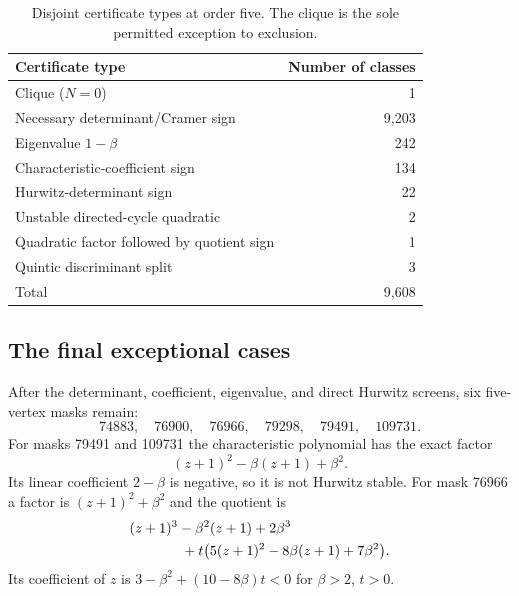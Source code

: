 \documentclass[11pt,a4paper]{article}
\theoremstyle{definition}\newtheorem{definition}[theorem]{Definition}
\theoremstyle{remark}\newtheorem{remark}[theorem]{Remark}
\begin{document}
\begin{table}[ht]
\centering
\caption{Disjoint certificate types at order five. The clique is the sole permitted exception to exclusion.}
\begin{tabular}{lr}\toprule
Certificate type & Number of classes\\\midrule
Clique ($N=0$)&1\\
Necessary determinant/Cramer sign&9,203\\
Eigenvalue $1-\beta$&242\\
Characteristic-coefficient sign&134\\
Hurwitz-determinant sign&22\\
Unstable directed-cycle quadratic&2\\
Quadratic factor followed by quotient sign&1\\
Quintic discriminant split&3\\\midrule
Total&9,608\\\bottomrule
\end{tabular}
\end{table}

\subsection{The final exceptional cases}
After the determinant, coefficient, eigenvalue, and direct Hurwitz screens, six five-vertex masks remain:
\[
74883,\quad76900,\quad76966,\quad79298,\quad79491,\quad109731.
\]
For masks 79491 and 109731 the characteristic polynomial has the exact factor
\begin{equation}\label{eq:cyclefactor}
 (z+1)^2-\beta(z+1)+\beta^2.
\end{equation}
Its linear coefficient $2-\beta$ is negative, so it is not Hurwitz stable.
For mask 76966 a factor is $(z+1)^2+\beta^2$ and the quotient is
\begin{align}\label{eq:quotient}
 &(z+1)^3-\beta^2(z+1)+2\beta^3\notag\\
 &\hspace{13mm}+t\bigl(5(z+1)^2-8\beta(z+1)+7\beta^2\bigr).
\end{align}
Its coefficient of $z$ is $3-\beta^2+(10-8\beta)t<0$ for $\beta>2$, $t>0$.
\end{document}
